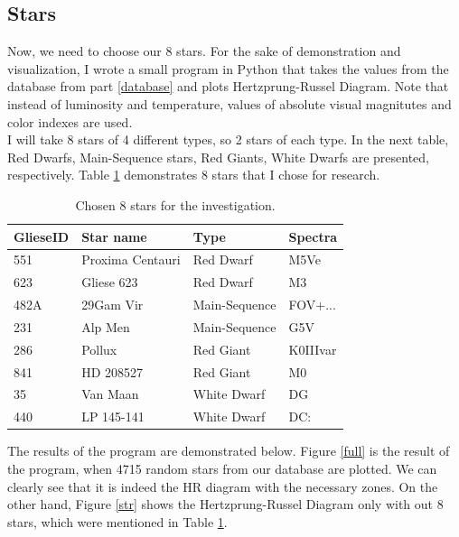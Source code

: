 \documentclass{article}
\begin{document}
  \subsection{Stars}
  
  Now, we need to choose our 8 stars. For the sake of demonstration and visualization, I wrote a small program in Python that takes the values from the database from part \ref{database} and plots Hertzprung-Russel Diagram. Note that instead of luminosity and temperature, values of absolute visual magnitutes and color indexes are used.\\
  
  I will take 8 stars of 4 different types, so 2 stars of each type. In the next table, Red Dwarfs, Main-Sequence stars, Red Giants, White Dwarfs are presented, respectively. Table \ref{stars} demonstrates 8 stars that I chose for research.\\
  
  \begin{table}[h!]
    \begin{center}
      \caption{Chosen 8 stars for the investigation.}
      \begin{tabular}{l | l | l | l}
        \textbf{GlieseID} & \textbf{Star name} & \textbf{Type} & \textbf{Spectra}\\
        \hline
        551  & Proxima Centauri & Red Dwarf     & M5Ve\\
        623  & Gliese 623       & Red Dwarf     & M3\\
        482A & 29Gam Vir        & Main-Sequence & FOV+...\\
        231  & Alp Men          & Main-Sequence & G5V\\
        286  & Pollux           & Red Giant     & K0IIIvar\\
        841  & HD 208527        & Red Giant     & M0\\
        35   & Van Maan         & White Dwarf   & DG\\
        440  & LP 145-141       & White Dwarf   & DC:\\
      \end{tabular}
      \label{stars}
    \end{center}
  \end{table}
  
  The results of the program are demonstrated below. Figure \ref{full} is the result of the program, when 4715 random stars from our database are plotted. We can clearly see that it is indeed the HR diagram with the necessary zones. On the other hand, Figure \ref{str} shows the Hertzprung-Russel Diagram only with out 8 stars, which were mentioned in Table \ref{stars}.\\
\end{document}
